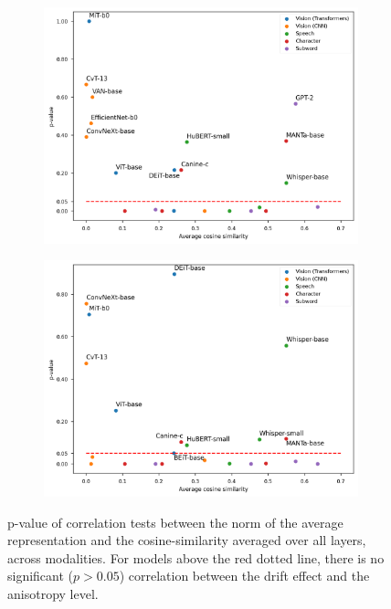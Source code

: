 \begin{figure}[ht]
     \centering
     \begin{subfigure}[b]{0.43\columnwidth}
          \includegraphics[width=\linewidth]{sources/part_1/anisotropy/imgs/pval_vs_cosine_spearman.png}
          \label{fig:pval_vs_cos_spearman}
     \end{subfigure}
     \hfill
     \begin{subfigure}[b]{0.43\columnwidth}
          \includegraphics[width=\linewidth]{sources/part_1/anisotropy/imgs/pval_vs_cosine_pearson.png}
          \label{fig:pval_vs_cos_pearson}
     \end{subfigure}
     \caption{p-value of correlation tests between the norm of the average representation and the cosine-similarity averaged over all layers, across modalities. For models above the red dotted line, there is no significant ($p>0.05$) correlation between the drift effect and the anisotropy level.}
     \label{fig:pval_vs_cos}
 \end{figure}


